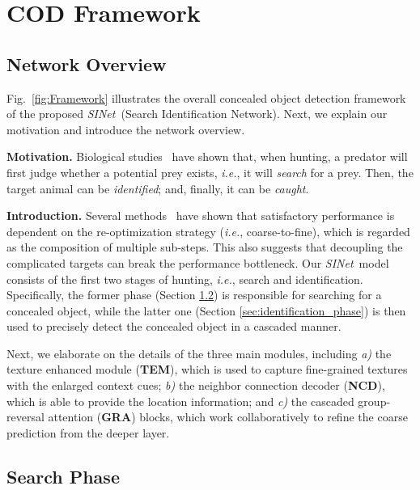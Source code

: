 \documentclass[10pt,journal,compsoc]{IEEEtran}
\def\ie{\emph{i.e.}}
\newcommand{\myPara}[1]{\vspace{6pt}\noindent\textbf{#1}\qquad }
\newcommand{\figref}[1]{Fig.~\ref{#1}}
\newcommand{\secref}[1]{Section \ref{#1}}
\def\ournewmodel{\emph{SINet}}
\begin{document}
\section{COD Framework}\label{sec:ourmodel}

\subsection{Network Overview}
\figref{fig:Framework} illustrates the overall concealed object detection 
framework of the proposed \ournewmodel~(Search Identification Network). 
Next, we explain our motivation and introduce the network overview.

\myPara{Motivation.}
%
Biological studies~\cite{hall2013camouflage} have shown that, when hunting, 
a predator will first judge whether a potential prey exists, \ie, 
it will \emph{search} for a prey.
Then, the target animal can be \emph{identified}; and, finally, 
it can be \emph{caught}.


\myPara{Introduction.}
%
Several methods~\cite{qin2019basnet,xu2017deep} have shown that satisfactory 
performance is dependent on the re-optimization strategy (\ie, coarse-to-fine), 
which is regarded as the composition of multiple sub-steps.
%
This also suggests that decoupling the complicated targets can break the
performance bottleneck.
%
Our \ournewmodel~model consists of the first two stages of hunting, 
\ie, search and identification.
%
Specifically, the former phase (\secref{sec:search_phase}) is responsible for 
searching for a concealed object, 
while the latter one (\secref{sec:identification_phase}) is then 
used to precisely detect the concealed object in a cascaded manner.

Next, we elaborate on the details of the three main modules, including 
\textit{a)} the texture enhanced module (\textbf{TEM}), 
which is used to capture fine-grained textures with the enlarged context cues; 
\textit{b)} the neighbor connection decoder (\textbf{NCD}), 
which is able to provide the location information; and 
\textit{c)} the cascaded group-reversal attention (\textbf{GRA}) blocks, 
which work collaboratively to refine the coarse prediction from 
the deeper layer.



\subsection{Search Phase}\label{sec:search_phase}
\end{document}
